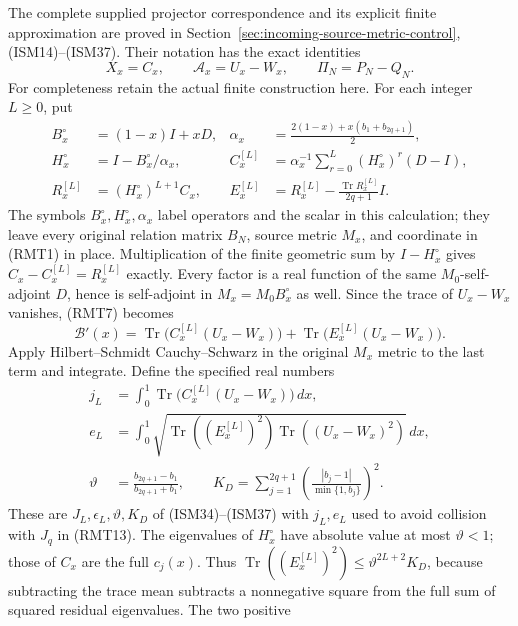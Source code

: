 The complete supplied projector correspondence and its explicit
finite approximation are proved in
Section~\ref{sec:incoming-source-metric-control}, (ISM14)--(ISM37).
Their notation has the exact identities
\[
 X_x=C_x,\qquad \mathcal A_x=U_x-W_x,\qquad
 \Pi_N=P_N-Q_N.
\]
For completeness retain the actual finite construction here.
For each integer \(L\geq0\), put
\[
 \begin{aligned}
 B_x^\circ&=(1-x)I+xD,&
 \alpha_x&=\frac{2(1-x)+x(b_1+b_{2q+1})}{2},\\
 H_x^\circ&=I-B_x^\circ/\alpha_x,&
 C_x^{[L]}&=\alpha_x^{-1}\sum_{r=0}^{L}
                      (H_x^\circ)^r(D-I),\\
 R_x^{[L]}&=(H_x^\circ)^{L+1}C_x,&
 E_x^{[L]}&=R_x^{[L]}-\frac{\operatorname{Tr}R_x^{[L]}}{2q+1}I.
 \end{aligned}
 \tag{RMT19}
\]
The symbols \(B_x^\circ,H_x^\circ,\alpha_x\) label operators and
the scalar in this calculation; they leave every original
relation matrix \(B_N\), source metric \(M_x\), and coordinate
in (RMT1) in place.  Multiplication of the finite geometric sum
by \(I-H_x^\circ\) gives
\(C_x-C_x^{[L]}=R_x^{[L]}\) exactly.  Every factor is a real
function of the same \(M_0\)-self-adjoint \(D\), hence is
self-adjoint in \(M_x=M_0B_x^\circ\) as well.  Since the
trace of \(U_x-W_x\) vanishes, (RMT7) becomes
\[
 \mathcal B'(x)=
 \operatorname{Tr}\bigl(C_x^{[L]}(U_x-W_x)\bigr)
 +\operatorname{Tr}\bigl(E_x^{[L]}(U_x-W_x)\bigr).
\]
Apply Hilbert--Schmidt Cauchy--Schwarz in the original \(M_x\)
metric to the last term and integrate.  Define the specified
real numbers
\[
 \begin{split}
 j_L&=\int_0^1\operatorname{Tr}
                    \bigl(C_x^{[L]}(U_x-W_x)\bigr)\,dx,\\
 e_L&=\int_0^1
  \sqrt{\operatorname{Tr}((E_x^{[L]})^2)
                      \operatorname{Tr}((U_x-W_x)^2)}\,dx,\\
 \vartheta&=\frac{b_{2q+1}-b_1}{b_{2q+1}+b_1},\qquad
 K_D=\sum_{j=1}^{2q+1}
          \left(\frac{|b_j-1|}{\min\{1,b_j\}}\right)^2 .
 \end{split}
 \tag{RMT20}
\]
These are \(J_L,\epsilon_L,\vartheta,K_D\) of (ISM34)--(ISM37)
with \(j_L,e_L\) used to avoid collision with \(J_q\) in
(RMT13).  The eigenvalues of \(H_x^\circ\) have absolute
value at most \(\vartheta<1\); those of \(C_x\) are the
full \(c_j(x)\).  Thus
\(\operatorname{Tr}((E_x^{[L]})^2)
\leq\vartheta^{2L+2}K_D\), because subtracting the trace mean
subtracts a nonnegative square from the full sum of
squared residual eigenvalues.  The two positive
